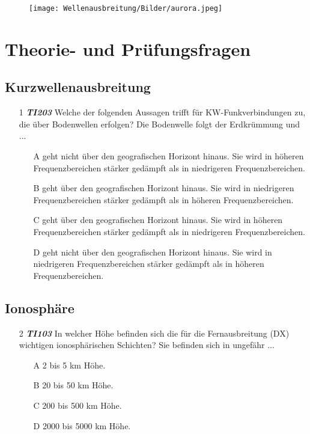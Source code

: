 \begin{wrapfigure}[0]{r}[-1cm]{4cm}
 \vspace{-6cm}
  \texttt{[image: Wellenausbreitung/Bilder/aurora.jpeg]}
 \vspace{-6cm}
\end{wrapfigure}

\section*{Theorie- und Prüfungsfragen}


\subsection*{Kurzwellenausbreitung}

\begin{enumerate} 
\itemsep1pt\parskip0pt
\item[1] \emph{\textbf{TI203}}  Welche der folgenden Aussagen trifft für KW-Funkverbindungen zu, die über Bodenwellen erfolgen? Die Bodenwelle folgt der Erdkrümmung und ...
	\begin{enumerate}
	\itemsep1pt\parskip0pt
		\item[A] geht nicht über den geografischen Horizont hinaus. Sie wird in höheren Frequenzbereichen stärker gedämpft als in niedrigeren Frequenzbereichen.
		\item[B] geht über den geografischen Horizont hinaus. Sie wird in niedrigeren Frequenzbereichen stärker gedämpft als in höheren Frequenzbereichen.
		\item[C] geht über den geografischen Horizont hinaus. Sie wird in höheren Frequenzbereichen stärker gedämpft als in niedrigeren Frequenzbereichen.
		\item[D] geht nicht über den geografischen Horizont hinaus. Sie wird in niedrigeren Frequenzbereichen stärker gedämpft als in höheren Frequenzbereichen.
	\end{enumerate}
\end{enumerate}

\subsection*{Ionosphäre}

\begin{enumerate} 
\itemsep1pt\parskip0pt
\item[2] \emph{\textbf{TI103}}  In welcher Höhe befinden sich die für die Fernausbreitung (DX) wichtigen ionosphärischen Schichten? Sie befinden sich in ungefähr ...
	\begin{enumerate}
	\itemsep1pt\parskip0pt
		\item[A] 2 bis 5 km Höhe.
		\item[B] 20 bis 50 km Höhe.
		\item[C] 200 bis 500 km Höhe.
		\item[D] 2000 bis 5000 km Höhe.
	\end{enumerate}
\end{enumerate}

